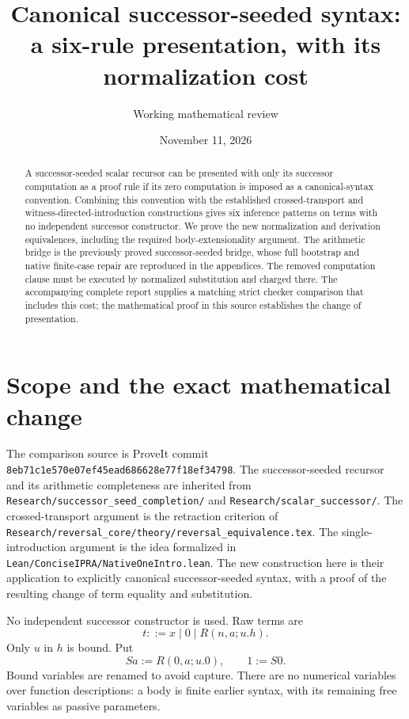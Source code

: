 \documentclass[11pt]{article}
\title{Canonical successor-seeded syntax:\\a six-rule presentation, with its normalization cost}
\author{Working mathematical review}
\date{November 11, 2026}
\theoremstyle{definition}\newtheorem{definition}[theorem]{Definition}
\newcommand{\file}[1]{{\small\nolinkurl{#1}}}
\begin{document}
\maketitle

\begin{abstract}
A successor-seeded scalar recursor can be presented with only its successor computation as a proof rule if its zero computation is imposed as a canonical-syntax convention. Combining this convention with the established crossed-transport and witness-directed-introduction constructions gives six inference patterns on terms with no independent successor constructor. We prove the new normalization and derivation equivalences, including the required body-extensionality argument. The arithmetic bridge is the previously proved successor-seeded bridge, whose full bootstrap and native finite-case repair are reproduced in the appendices. The removed computation clause must be executed by normalized substitution and charged there. The accompanying complete report supplies a matching strict checker comparison that includes this cost; the mathematical proof in this source establishes the change of presentation.
\end{abstract}

\section{Scope and the exact mathematical change}

The comparison source is ProveIt commit
\texttt{8eb71c1e570e07ef45ead686628e77f18ef34798}.
The successor-seeded recursor and its arithmetic completeness are inherited from
\file{Research/successor_seed_completion/} and
\file{Research/scalar_successor/}.
The crossed-transport argument is the retraction criterion of
\file{Research/reversal_core/theory/reversal_equivalence.tex}.
The single-introduction argument is the idea formalized in
\file{Lean/ConciseIPRA/NativeOneIntro.lean}.
The new construction here is their application to explicitly canonical successor-seeded syntax, with a proof of the resulting change of term equality and substitution.

No independent successor constructor is used. Raw terms are
\[
t::=x\mid 0\mid R(n,a;u.h).
\]
Only \(u\) in \(h\) is bound. Put
\[
Sa:=R(0,a;u.0),\qquad 1:=S0.
\]
Bound variables are renamed to avoid capture. There are no numerical variables over function descriptions: a body is finite earlier syntax, with its remaining free variables as passive parameters.
\end{document}
